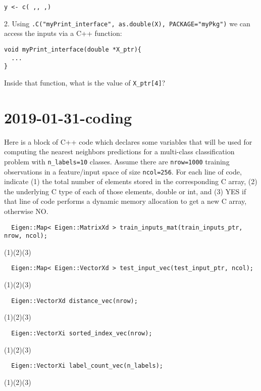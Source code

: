 \documentclass{article}
\begin{document}
\texttt{y <- c(%
\underline{\hspace{1cm}},\underline{\hspace{1cm}},%
\underline{\hspace{1cm}},\underline{\hspace{1cm}})}

2. Using \verb|.C("myPrint_interface", as.double(X), PACKAGE="myPkg")| we can
access the inputs via a C++ function:

\begin{verbatim}
void myPrint_interface(double *X_ptr){
  ...
}
\end{verbatim}

Inside that function, what is the value of \verb|X_ptr[4]|? \underline{\hspace{1in}}

\newpage
\section{2019-01-31-coding}
Here is a block of C++ code which declares some variables that will be
used for computing the nearest neighbors predictions for a multi-class
classification problem with \verb|n_labels=10| classes. Assume there
are \verb|nrow=1000| training observations in a feature/input space of
size \verb|ncol=256|. For each line of code, indicate (1) the total
number of elements stored in the corresponding C array, (2) the
underlying C type of each of those elements, double or int, and (3)
YES if that line of code performs a dynamic memory allocation to get a
new C array, otherwise NO.
\newcommand{\oneblank}{\underline{\hspace{2in}}}
\newcommand{\blanks}{(1)\oneblank (2)\oneblank (3)\oneblank\vskip 1cm}
\begin{verbatim}
  Eigen::Map< Eigen::MatrixXd > train_inputs_mat(train_inputs_ptr, nrow, ncol);
\end{verbatim}
\blanks
\begin{verbatim}
  Eigen::Map< Eigen::VectorXd > test_input_vec(test_input_ptr, ncol);
\end{verbatim}
\blanks
\begin{verbatim}
  Eigen::VectorXd distance_vec(nrow);
\end{verbatim}
\blanks
\begin{verbatim}
  Eigen::VectorXi sorted_index_vec(nrow);
\end{verbatim}
\blanks
\begin{verbatim}
  Eigen::VectorXi label_count_vec(n_labels);
\end{verbatim}
\blanks
\end{document}
